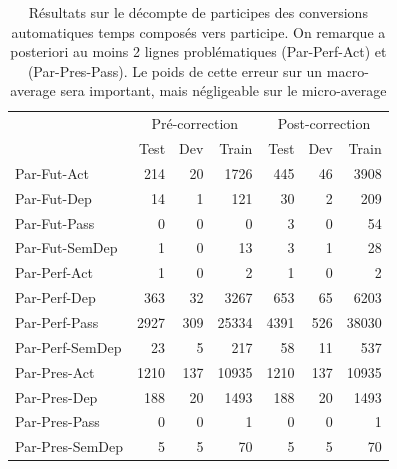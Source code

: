 \begin{table}[h]
\centering
\begin{tabular}{l|rrr|rrr}
\toprule
 & \multicolumn{3}{c}{Pré-correction} & \multicolumn{3}{c}{Post-correction} \\ 
 & Test & Dev & Train & Test & Dev & Train \\ \midrule
Par-Fut-Act & 214 & 20 & 1726 & 445 & 46 & 3908 \\
Par-Fut-Dep & 14 & 1 & 121 & 30 & 2 & 209 \\
Par-Fut-Pass & 0 & 0 & 0 & 3 & 0 & 54 \\
Par-Fut-SemDep & 1 & 0 & 13 & 3 & 1 & 28 \\
Par-Perf-Act & 1 & 0 & 2 & 1 & 0 & 2 \\
Par-Perf-Dep & 363 & 32 & 3267 & 653 & 65 & 6203 \\
Par-Perf-Pass & 2927 & 309 & 25334 & 4391 & 526 & 38030 \\
Par-Perf-SemDep & 23 & 5 & 217 & 58 & 11 & 537 \\
Par-Pres-Act & 1210 & 137 & 10935 & 1210 & 137 & 10935 \\
Par-Pres-Dep & 188 & 20 & 1493 & 188 & 20 & 1493 \\
Par-Pres-Pass & 0 & 0 & 1 & 0 & 0 & 1 \\
Par-Pres-SemDep & 5 & 5 & 70 & 5 & 5 & 70 \\ \bottomrule
\end{tabular}
\caption{Résultats sur le décompte de participes des conversions automatiques temps composés vers participe. On remarque a posteriori au moins 2 lignes problématiques (Par-Perf-Act) et (Par-Pres-Pass). Le poids de cette erreur sur un macro-average sera important, mais négligeable sur le micro-average}
\label{table:lasla:correction-temps}
\end{table}

\begin{table}[ht]
\centering
{}
\caption{Résultats sur les trois formes principales du participe. En dehors d'un avantage de 2 points sur le rappel des participes présents actifs, tous les autres scores connaissent une augmentation notable, malgré une augmentation nette du nombre de données à tester.}
\label{table:lasla:main-particips}
\end{table} 

